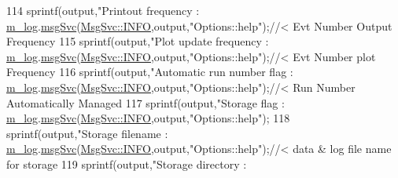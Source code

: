 \begin{DoxyCode}
{{{{{114   sprintf(output,\textcolor{stringliteral}{"Printout frequency          : %
      \hyperlink{classOptions_a80d2caed71dd935c104f0133504251e9}{m\_log}.\hyperlink{classMsgSvc_ad25f18047920cc59a314e5098259711c}{msgSvc}(\hyperlink{classMsgSvc_ae671eb7301996cd049d2da8a65925926ad2fcf3f3e734fc41ee097cc23670ce51}{MsgSvc::INFO},output,\textcolor{stringliteral}{"Options::help"});\textcolor{comment}{//< Evt Number Output Frequency}
115   sprintf(output,\textcolor{stringliteral}{"Plot update frequency       : %
      \hyperlink{classOptions_a80d2caed71dd935c104f0133504251e9}{m\_log}.\hyperlink{classMsgSvc_ad25f18047920cc59a314e5098259711c}{msgSvc}(\hyperlink{classMsgSvc_ae671eb7301996cd049d2da8a65925926ad2fcf3f3e734fc41ee097cc23670ce51}{MsgSvc::INFO},output,\textcolor{stringliteral}{"Options::help"});\textcolor{comment}{//< Evt Number plot Frequency}
116   sprintf(output,\textcolor{stringliteral}{"Automatic run number flag   : %
      \hyperlink{classOptions_a80d2caed71dd935c104f0133504251e9}{m\_log}.\hyperlink{classMsgSvc_ad25f18047920cc59a314e5098259711c}{msgSvc}(\hyperlink{classMsgSvc_ae671eb7301996cd049d2da8a65925926ad2fcf3f3e734fc41ee097cc23670ce51}{MsgSvc::INFO},output,\textcolor{stringliteral}{"Options::help"});\textcolor{comment}{//< Run Number Automatically
       Managed}
117   sprintf(output,\textcolor{stringliteral}{"Storage flag                : %
      \hyperlink{classOptions_a80d2caed71dd935c104f0133504251e9}{m\_log}.\hyperlink{classMsgSvc_ad25f18047920cc59a314e5098259711c}{msgSvc}(\hyperlink{classMsgSvc_ae671eb7301996cd049d2da8a65925926ad2fcf3f3e734fc41ee097cc23670ce51}{MsgSvc::INFO},output,\textcolor{stringliteral}{"Options::help"});
118   sprintf(output,\textcolor{stringliteral}{"Storage filename            : %
      \hyperlink{classOptions_a80d2caed71dd935c104f0133504251e9}{m\_log}.\hyperlink{classMsgSvc_ad25f18047920cc59a314e5098259711c}{msgSvc}(\hyperlink{classMsgSvc_ae671eb7301996cd049d2da8a65925926ad2fcf3f3e734fc41ee097cc23670ce51}{MsgSvc::INFO},output,\textcolor{stringliteral}{"Options::help"});\textcolor{comment}{//< data & log file name for
       storage}
119   sprintf(output,\textcolor{stringliteral}{"Storage directory           : %
}}}}}}}}}}}
\end{DoxyCode}
